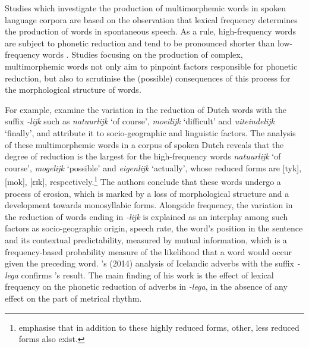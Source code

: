 Studies which investigate the production of multimorphemic words in spoken language corpora are based on the observation that lexical frequency determines the production of words in spontaneous speech. As a rule, high-frequency words are subject to phonetic reduction \citep{bybee2000} and tend to be pronounced shorter than low-frequency words \citep{jurafsky-etal2001}. Studies focusing on the production of complex, multimorphemic words not only aim to pinpoint factors responsible for phonetic reduction, but also to scrutinise the (possible) consequences of this process for the morphological structure of words. 

For example, \citet{keune-etal2005} examine the  variation in the reduction of Dutch words with the suffix \textit{-lijk} such as \textit{natuurlijk} `of course', \textit{moeilijk} `difficult' and \textit{uiteindelijk} `finally', and attribute it to socio-geographic and linguistic factors. The analysis of these multimorphemic words in a corpus of spoken Dutch reveals that the degree of reduction is the largest for the high-frequency words \textit{natuurlijk} `of course',  \textit{mogelijk} `possible' and \textit{eigenlijk} `actually', whose reduced forms are [tyk], [mok], [ɛɪk], respectively.\footnote{\citet{keune-etal2005} emphasise that in addition to these highly reduced forms, other, less reduced forms also exist.} The authors conclude that these words undergo a process of erosion, which is marked by a loss of morphological structure and a development towards monosyllabic forms. Alongside frequency, the variation in the reduction of words ending in \textit{-lijk} is explained as an interplay among such factors as socio-geographic origin, speech rate, the word's position in the sentence and its contextual predictability, measured by mutual information, which is a frequency-based probability measure of the likelihood that a word would occur given the preceding word. \citeauthor{schaefer2014}'s (2014) analysis of Icelandic adverbs with the suffix \textit{-lega} confirms \citeauthor{keune-etal2005}'s result. The main finding of his work is the effect of lexical frequency on the phonetic reduction of adverbs in \textit{-lega}, in the absence of any effect on the part of metrical rhythm. 

